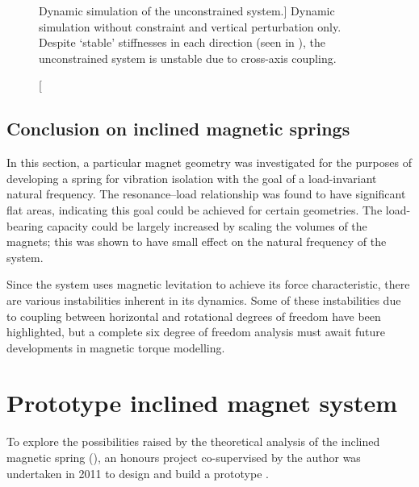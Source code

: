 \documentclass[11pt,a4paper]{memoir}
\begin{document}
\begin{figure}
\begin{wide}
\hspace*{-1cm}%
\quad
{}\quad
{}
\end{wide}
\caption
[Dynamic simulation of the unconstrained system.]
{Dynamic simulation without constraint and vertical perturbation only. Despite `stable' stiffnesses in each direction (seen in ), the unconstrained system is unstable due to cross-axis coupling.}
\end{figure}

\subsection{Conclusion on inclined magnetic springs}

In this section, a particular magnet geometry was investigated for the purposes of developing a spring for vibration isolation with the goal of a load-invariant natural frequency.
The resonance--load relationship was found to have significant flat areas, indicating this goal could be achieved for certain geometries.
The load-bearing capacity could be largely increased by scaling the volumes of the magnets; this was shown to have small effect on the natural frequency of the system.

Since the system uses magnetic levitation to achieve its force characteristic, there are various instabilities inherent in its dynamics.
Some of these instabilities due to coupling between horizontal and rotational degrees of freedom have been highlighted, but a complete six degree of freedom analysis must await future developments in magnetic torque modelling.


\section{Prototype inclined magnet system}

To explore the possibilities raised by the theoretical analysis of the inclined magnetic spring (), an honours project co-supervised by the author was undertaken in 2011 to design and build a prototype \cite{frizenschaf2011-honoursthesis,frizenschaf2011-acoustics2011}.
\end{document}
